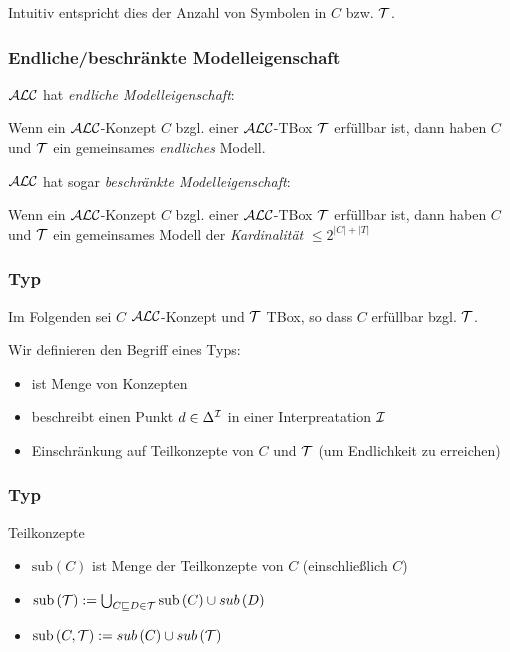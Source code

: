 Intuitiv entspricht dies der Anzahl von Symbolen in $C$ bzw. $\mathcal{T}$.

\subsubsection{Endliche/beschränkte Modelleigenschaft}

$\mathcal{A}\mathcal{L}\mathcal{C}$ hat \emph{endliche Modelleigenschaft}:

\begin{theorem}
Wenn ein $\mathcal{A}\mathcal{L}\mathcal{C}$-Konzept $C$ bzgl. einer $\mathcal{A}\mathcal{L}\mathcal{C}$-TBox $\mathcal{T}$ erfüllbar ist, dann haben $C$ und $\mathcal{T}$ ein gemeinsames \emph{endliches} Modell.
\end{theorem}

$\mathcal{A}\mathcal{L}\mathcal{C}$ hat sogar \emph{beschränkte Modelleigenschaft}:

\begin{theorem}
Wenn ein $\mathcal{A}\mathcal{L}\mathcal{C}$-Konzept $C$ bzgl. einer $\mathcal{A}\mathcal{L}\mathcal{C}$-TBox $\mathcal{T}$ erfüllbar ist, dann haben $C$ und $\mathcal{T}$ ein gemeinsames Modell der \emph{Kardinalität} $\leq 2^{|C|+|T|}$
\end{theorem}

\subsubsection{Typ}

Im Folgenden sei $C$ $\mathcal{A}\mathcal{L}\mathcal{C}$-Konzept und $\mathcal{T}$ TBox, so dass $C$ erfüllbar bzgl. $\mathcal{T}$.

Wir definieren den Begriff eines Typs:

\begin{itemize}
  \item ist Menge von Konzepten
  \item beschreibt einen Punkt $d \in \Delta^{\mathcal{I}}$ in einer Interpreatation $\mathcal{I}$
  \item Einschränkung auf Teilkonzepte von $C$ und $\mathcal{T}$ (um Endlichkeit zu erreichen)
\end{itemize}

\subsubsection{Typ}\label{typ}

\begin{definition}{Teilkonzepte}
\begin{itemize}
\item
  $\text{sub}\left( C \right)$ ist Menge der Teilkonzepte von $C$
  (einschließlich $C$)
\item
  $\text{sub}\left( \mathcal{T} \right) := \bigcup_{C \sqsubseteq D \in \mathcal{T}}^{}{\text{sub}\left( C \right) \cup sub\left( D \right)}$
\item
  $\text{sub}\left( C,\mathcal{T} \right) := sub\left( C \right) \cup sub\left( \mathcal{T} \right)$
\end{itemize}
\end{definition}

